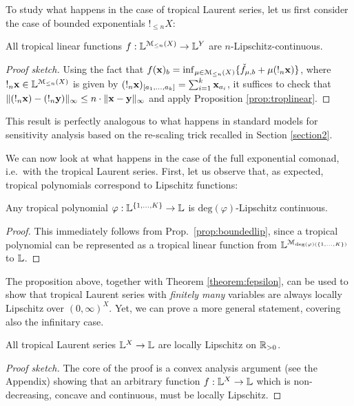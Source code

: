 To study what happens in the case of tropical Laurent series, let us first consider the case of bounded exponentials $!_{\leq n}X$:
\begin{proposition}\label{prop:boundedlip}
All tropical linear functions $f: \mathbb{L}^{\mathcal{M}_{\leq n}(X)}\to \mathbb{L}^{Y}$ are $n$-Lipschitz-continuous.
\end{proposition}
\begin{proof}[Proof sketch]
Using the fact that $f(\mathbf{x})_{b}=\inf_{\mu\in \mathcal{M}_{\leq n}(X)}\{ \check f_{\mu,b}+ \mu (!_{n}\mathbf{x}) \}$, where $!_{n}\mathbf{x}\in \mathbb{L}^{\mathcal{M}_{\leq n}(X)}$ is given by 
$(!_{n}\mathbf{x})_{[a_{1},\dots, a_{k}]}=\sum_{i=1}^{k}\mathbf{x}_{a_{i}}$, 
it suffices to check that $\| (!_{n}\mathbf{x})-(!_{n}\mathbf{y})\|_{\infty}\leq n\cdot \| \mathbf{x}-\mathbf{y}\|_{\infty}$ and apply Proposition \ref{prop:troplinear}.
\end{proof}
This result is perfectly analogous to what happens in standard models for sensitivity analysis based on the re-scaling trick recalled in Section \ref{section2}.

We can now look at what happens in the case of the full exponential comonad, i.e.~with the tropical Laurent series.
First, let us observe that, as expected, tropical polynomials 
correspond to Lipschitz functions:
\begin{proposition}
Any tropical polynomial $\varphi:\mathbb{L}^{\{1,\dots, K\}}\to\mathbb{L}$ is $\mathrm{deg}(\varphi)$-Lipschitz continuous.
\end{proposition}
\begin{proof}
This immediately follows from Prop.~\ref{prop:boundedlip}, since a tropical polynomial can be represented as a tropical linear function from $\mathbb{L}^{\mathcal{M}_{\mathrm{deg}(\varphi)(\{1,\dots, K\})}}$ to $\mathbb{L}$.
\end{proof}

The proposition above, together with Theorem \ref{theorem:fepsilon}, can be used to show that tropical Laurent series with \emph{finitely many} variables are always locally Lipschitz over $(0,\infty)^{X}$. Yet, we can prove a more general statement, covering also the infinitary case.


\begin{theorem}
 All tropical Laurent series $\mathbb{L}^X\to\mathbb{L}$ are locally Lipschitz on $\mathbb{R}_{>0}$.
\end{theorem}
\begin{proof}[Proof sketch]
The core of the proof is a convex analysis argument (see the Appendix) showing that an arbitrary function $f:\mathbb{L}^X\to\mathbb{L}$ which is non-decreasing, concave and continuous, must be locally Lipschitz. 
\end{proof}


